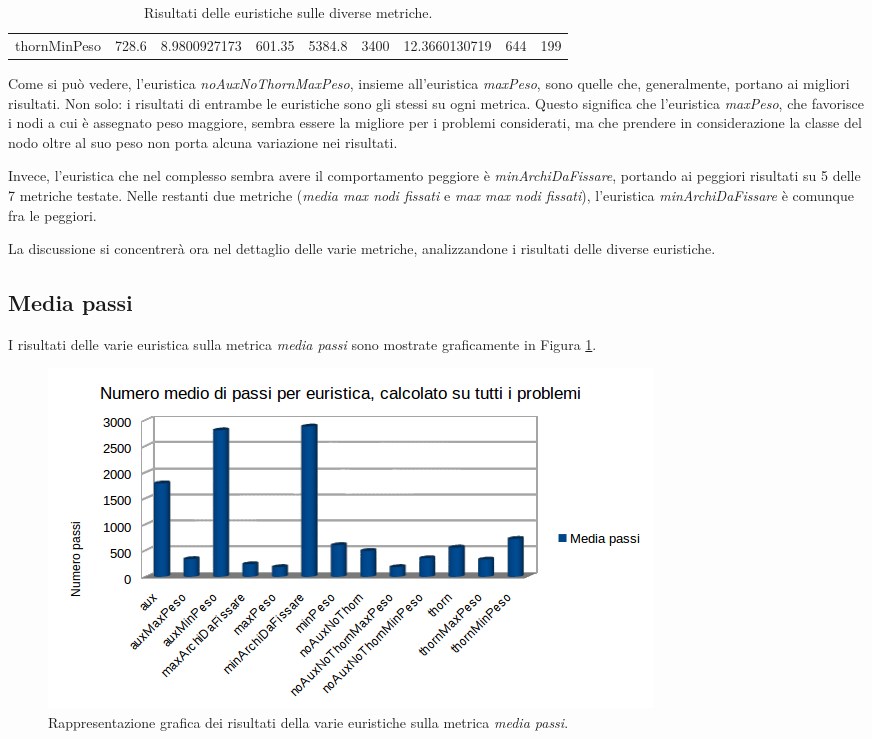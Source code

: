 \begin{table}
\begin{tabular}{l|c|c|c|c|c|c|c|c}
thornMinPeso        & 728.6                & 8.9800927173                                                     & 601.35                                                                      & 5384.8                                                                     & 3400               & 12.3660130719                                                  & 644                                                                     & 199                                                                   
\end{tabular}
\caption{Risultati delle euristiche sulle diverse metriche.}
\label{tab:results}
\end{table}

Come si può vedere, l'euristica \textit{noAuxNoThornMaxPeso}, insieme all'euristica \textit{maxPeso}, sono quelle che, generalmente, portano ai migliori risultati. Non solo: i risultati di entrambe le euristiche sono gli stessi su ogni metrica. Questo significa che l'euristica \textit{maxPeso}, che favorisce i nodi a cui è assegnato peso maggiore, sembra essere la migliore per i problemi considerati, ma che prendere in considerazione la classe del nodo oltre al suo peso non porta alcuna variazione nei risultati.

Invece, l'euristica che nel complesso sembra avere il comportamento peggiore è \textit{minArchiDaFissare}, portando ai peggiori risultati su 5 delle 7 metriche testate. Nelle restanti due metriche (\textit{media max nodi fissati} e \textit{max max nodi fissati}), l'euristica \textit{minArchiDaFissare} è comunque fra le peggiori.

La discussione si concentrerà ora nel dettaglio delle varie metriche, analizzandone i risultati delle diverse euristiche.

\subsection{Media passi}
\label{subsec:mediaPassi}
I risultati delle varie euristica sulla metrica \textit{media passi} sono mostrate graficamente in Figura \ref{fig:mediaPassi}.

\begin{figure}[H]
\includegraphics[width=\textwidth]{res/img/mediaPassi.png}
\caption{Rappresentazione grafica dei risultati della varie euristiche sulla metrica \textit{media passi}.}
\label{fig:mediaPassi}
\end{figure}

